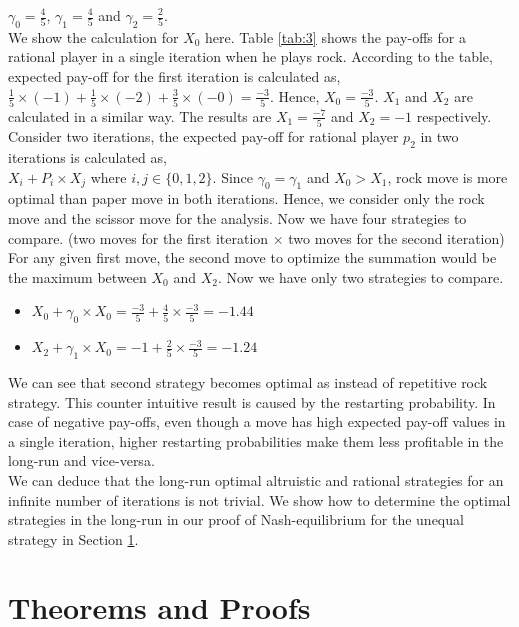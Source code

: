 $\gamma_0=\frac{4}{5}$, $\gamma_1=\frac{4}{5}$ and $\gamma_2=\frac{2}{5}$.\\
We show the calculation for $X_0$ here. 
Table \ref{tab:3} shows the pay-offs for a rational player in a single iteration when he plays rock. According to the table, expected pay-off for the first iteration is calculated as,\\
$\frac{1}{5}\times (-1) + \frac{1}{5}\times (-2) + \frac{3}{5}\times (-0) = \frac{-3}{5}$. Hence, $X_0=\frac{-3}{5}$. $X_1$ and $X_2$ are calculated in a similar way. The results are $X_1=\frac{-7}{5}$ and $X_2=-1$ respectively.\\
Consider two iterations, the expected pay-off for rational player $p_2$ in two iterations is calculated as, \\
$X_i+P_i\times X_j$ where $i,j \in \{0,1,2\}$. Since $\gamma_0=\gamma_1$ and $X_0 > X_1$, rock move is more optimal than paper move in both iterations. Hence, we consider only the rock move and the scissor move for the analysis. Now we have four strategies to compare. (two moves for the first iteration $\times$ two moves for the second iteration) For any given first move, the second move to optimize the summation would be the maximum between $X_0$ and $X_2$. Now we have only two strategies to compare.\\
\begin{itemize}
	\item $X_0+\gamma_0\times X_0= \frac{-3}{5} + \frac{4}{5}\times \frac{-3}{5}=-1.44 $\\
	\item $X_2+\gamma_1\times X_0= -1 + \frac{2}{5}\times \frac{-3}{5}=-1.24$
\end{itemize}
We can see that second strategy becomes optimal as instead of repetitive rock strategy. This counter intuitive result is caused by the restarting probability. In case of negative pay-offs, even though a move has high expected pay-off values in a single iteration, higher restarting probabilities make them less profitable in the long-run and vice-versa.\\
 We can deduce that the long-run optimal altruistic and rational strategies for an infinite number of iterations is not trivial. We show how to determine the optimal strategies in the long-run in our proof of Nash-equilibrium for the unequal strategy in Section \ref{sec:proofs}.
\section{Theorems and Proofs}\label{sec:proofs}

